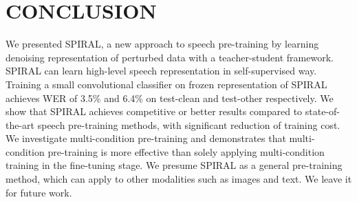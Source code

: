 \section{CONCLUSION}
\label{conclusion}
We presented SPIRAL, a new approach to speech pre-training by learning denoising representation of perturbed data with a teacher-student framework.
SPIRAL can learn high-level speech representation in self-supervised way. Training a small convolutional classifier on frozen representation of SPIRAL achieves WER of 3.5\% and 6.4\% on \libri{} test-clean and test-other respectively.
We show that SPIRAL achieves competitive or better results compared to state-of-the-art speech pre-training methods, with significant reduction of training cost. We investigate multi-condition pre-training and demonstrates that multi-condition pre-training is more effective than solely applying multi-condition training in the fine-tuning stage. We presume SPIRAL as a general pre-training method, which can 
apply to other modalities such as images and text. We leave it for future work.

\newpage

